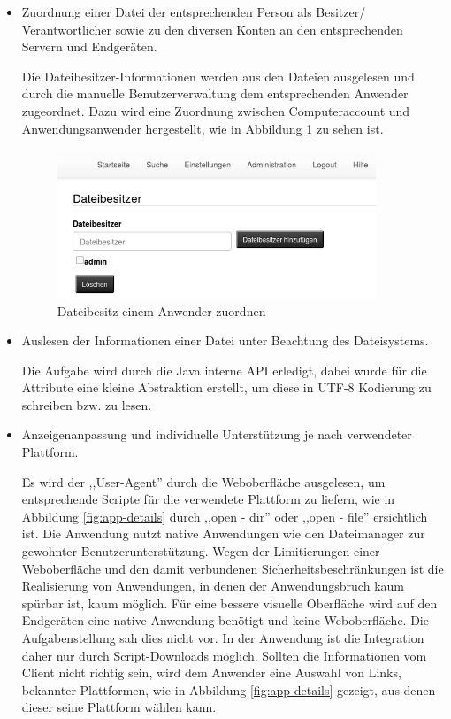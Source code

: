 \documentclass[oneside, ngerman, toc=bibliography,bibliography=totoc,listof=entryprefix, open=right,numbers=noenddot,fontsize=12pt]{scrbook}
\begin{document}
\begin{itemize}
     \item Zuordnung einer Datei der entsprechenden Person als Besitzer/ Verantwortlicher sowie zu den diversen Konten an den entsprechenden Servern und Endgeräten.
     
    Die Dateibesitzer-Informationen werden aus den Dateien ausgelesen und durch die manuelle Benutzerverwaltung dem entsprechenden Anwender zugeordnet. Dazu wird eine Zuordnung zwischen Computeraccount und Anwendungsanwender hergestellt, wie in  Abbildung \ref{fig:app-cfg-datei} zu sehen ist.
    
    \begin{figure}[htbp] 
        \centering
        \includegraphics[width=0.9\textwidth]{Masterarbeit_Bilder/einstellungen_dateibesitzer.png}
        \caption{Dateibesitz einem Anwender zuordnen}
        \label{fig:app-cfg-datei}
    \end{figure}  
    
   
    \item Auslesen der Informationen einer Datei unter Beachtung des Dateisystems.
    
    Die Aufgabe wird durch die Java interne API erledigt, dabei wurde für die Attribute eine kleine Abstraktion erstellt, um diese in UTF-8 Kodierung zu schreiben bzw. zu lesen. 
    
       
    \item Anzeigenanpassung und individuelle Unterstützung je nach verwendeter Plattform.
    
    Es wird  der ,,User-Agent'' durch die Weboberfläche ausgelesen, um entsprechende Scripte für die verwendete Plattform zu liefern, wie in Abbildung \ref{fig:app-details} durch ,,open - dir'' oder ,,open - file'' ersichtlich ist.
    Die Anwendung nutzt native Anwendungen wie den Dateimanager zur gewohnter Benutzerunterstützung. Wegen der Limitierungen einer Weboberfläche und den damit verbundenen Sicherheitsbeschränkungen ist die Realisierung von Anwendungen, in denen der Anwendungsbruch kaum spürbar ist, kaum möglich. Für eine bessere visuelle Oberfläche wird auf den Endgeräten eine native Anwendung benötigt und keine Weboberfläche. Die Aufgabenstellung sah dies nicht vor. In der Anwendung ist die Integration daher nur durch Script-Downloads möglich. 
    Sollten die Informationen vom Client nicht richtig sein, wird dem Anwender eine Auswahl von Links, bekannter Plattformen, wie in Abbildung \ref{fig:app-details} gezeigt, aus denen dieser seine Plattform wählen kann.
    

\end{itemize}
\end{document}
